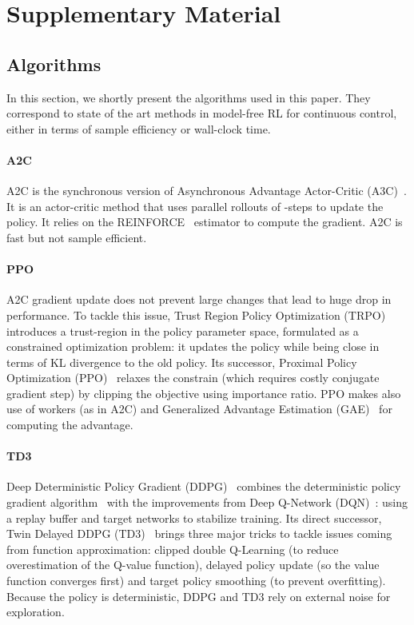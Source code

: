 \documentclass{article}
\newcommand{\aac}{\textsc{A2C}\xspace}
\newcommand{\ppo}{\textsc{PPO}\xspace}
\newcommand{\tddd}{\textsc{TD3}\xspace}
\begin{document}
\appendix

\section{Supplementary Material}

\subsection{Algorithms}
\label{sec:algorithms}

In this section, we shortly present the algorithms used in this paper. They correspond to state of the art methods in model-free RL for continuous control, either in terms of sample efficiency or wall-clock time.

\paragraph{\aac}
\aac is the synchronous version of Asynchronous Advantage Actor-Critic (A3C)~\citep{mnih2016asynchronous}.
It is an actor-critic method that uses parallel rollouts of -steps to update the policy. It relies on the \textsc{REINFORCE}~\cite{williams1992simple} estimator to compute the gradient. \aac is fast but not sample efficient.


\paragraph{\ppo}
\aac gradient update does not prevent large changes that lead to huge drop in performance.
To tackle this issue, Trust Region Policy Optimization (TRPO)~\citep{schulman2015trust} introduces a trust-region in the policy parameter space, formulated as a constrained optimization problem: it updates the policy while being close in terms of KL divergence to the old policy.
Its successor, Proximal Policy Optimization (\ppo)~\citep{schulman2017proximal} relaxes the constrain (which requires costly conjugate gradient step) by clipping the objective using importance ratio. \ppo makes also use of workers (as in \aac) and Generalized Advantage Estimation (GAE)~\citep{schulman2015high} for computing the advantage.


\paragraph{\tddd}
Deep Deterministic Policy Gradient (DDPG)~\citep{lillicrap2015continuous} combines the deterministic policy gradient algorithm~\cite{silver2014deterministic} with the improvements from Deep Q-Network (DQN)~\cite{mnih2013playing}: using a replay buffer and target networks to stabilize training.
Its direct successor, Twin Delayed DDPG (\tddd)~\citep{fujimoto2018addressing} brings three major tricks to tackle issues coming from function approximation: clipped double Q-Learning (to reduce overestimation of the Q-value function), delayed policy update (so the value function converges first) and target policy smoothing (to prevent overfitting).
Because the policy is deterministic, DDPG and \tddd rely on external noise for exploration.
\end{document}

